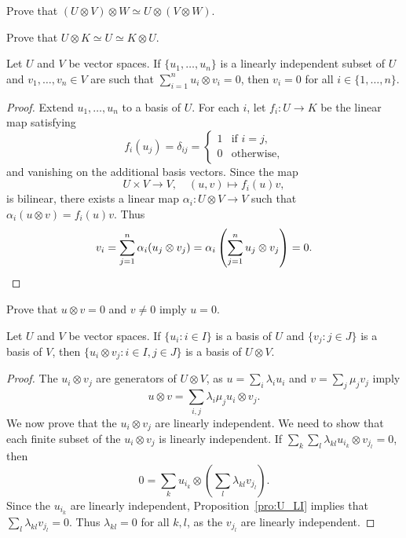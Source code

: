 \begin{exercise}
	\label{xca:UxVxW}
    Prove that $(U\otimes V)\otimes W\simeq U\otimes(V\otimes W)$.
\end{exercise}

\begin{exercise}
	\label{xca:UxK}
	Prove that $U\otimes K\simeq U\simeq K\otimes U$.
\end{exercise}

\begin{proposition}
	\label{pro:U_LI}
	Let $U$ and $V$ be vector spaces. 
	If $\{u_1,\dots,u_n\}$ is a linearly independent subset of $U$ and 
	$v_1,\dots,v_n\in V$ are such that $\sum_{i=1}^n u_i\otimes v_i=0$, then 
    $v_i=0$ for all $i\in\{1,\dots,n\}$.
\end{proposition}

\begin{proof}
	Extend $u_1,\dots,u_n$ to a basis of $U$. For each $i$, let $f_i\colon U\to K$ be the linear map satisfying 
	\[
	f_i(u_j)=\delta_{ij}=\begin{cases}
	1 & \text{if $i=j$},\\
	0 & \text{otherwise},
	\end{cases}
	\]
	and vanishing on the additional basis vectors. 
	Since the map 
 	\[
 	U\times V\to V,\quad (u,v)\mapsto f_i(u)v,
 	\]
 	is bilinear, there exists 
	a linear map 
	$\alpha_i\colon U\otimes V\to V$ such that $\alpha_i(u\otimes
	v)=f_i(u)v$. Thus
	\[
		v_i=\sum_{j=1}^n\alpha_i(u_j\otimes v_j)=\alpha_i\left(\sum_{j=1}^nu_j\otimes v_j\right)=0.\qedhere
	\]
\end{proof}

\begin{exercise}
	\label{xca:uxv=0}
	Prove that $u\otimes v=0$ and $v\ne 0$ imply $u=0$.
\end{exercise}

\begin{theorem}
    Let $U$ and $V$ be vector spaces. 
	If $\{u_i:i\in I\}$ is a basis of $U$ and $\{v_j:j\in J\}$ is a basis of $V$, then 
	$\{u_i\otimes v_j:i\in I,j\in J\}$ is a basis of $U\otimes
	V$.
\end{theorem}

\begin{proof}
	The $u_i\otimes v_j$ are generators of $U\otimes V$, as  
    $u=\sum_i\lambda_iu_i$ and $v=\sum_j\mu_jv_j$ imply 
	\[
    u\otimes v=\sum_{i,j}\lambda_i\mu_ju_i\otimes v_j.
    \]
	We now prove that the $u_i\otimes v_j$ are linearly independent. We need to show that
	each finite subset of the $u_i\otimes v_j$
	is linearly independent. If $\sum_k\sum_l\lambda_{kl}u_{i_k}\otimes
	v_{j_l}=0$, then 
	\[
0=\sum_{k}u_{i_k}\otimes\left(\sum_{l}\lambda_{kl}v_{j_l}\right).\]
    Since  
	the $u_{i_k}$ are linearly independent, Proposition~\ref{pro:U_LI}
	implies that $\sum_{l}\lambda_{kl}v_{j_l}=0$. Thus $\lambda_{kl}=0$ for all 
	$k,l$, as the $v_{j_l}$ are linearly independent. 
\end{proof}

